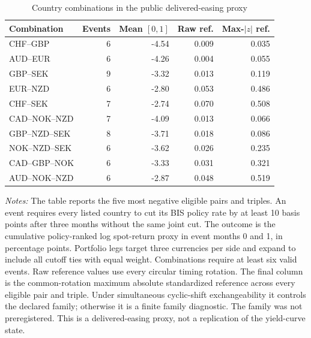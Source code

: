 \begin{table}[H]
\centering
\caption{Country combinations in the public delivered-easing proxy}
\label{tab:public-country-combinations}
\small
\begin{tabular}{lrrrr}
\toprule
Combination & Events & Mean $[0,1]$ & Raw ref. & Max-$|z|$ ref. \\
\midrule
CHF--GBP & 6 & -4.54 & 0.009 & 0.035 \\
AUD--EUR & 6 & -4.26 & 0.004 & 0.055 \\
GBP--SEK & 9 & -3.32 & 0.013 & 0.119 \\
EUR--NZD & 6 & -2.80 & 0.053 & 0.486 \\
CHF--SEK & 7 & -2.74 & 0.070 & 0.508 \\
CAD--NOK--NZD & 7 & -4.09 & 0.013 & 0.066 \\
GBP--NZD--SEK & 8 & -3.71 & 0.018 & 0.086 \\
NOK--NZD--SEK & 6 & -3.62 & 0.026 & 0.235 \\
CAD--GBP--NOK & 6 & -3.33 & 0.031 & 0.321 \\
AUD--NOK--NZD & 6 & -2.87 & 0.048 & 0.519 \\
\bottomrule
\end{tabular}
\begin{minipage}{0.94\textwidth}\footnotesize
\textit{Notes:} The table reports the five most negative eligible pairs and triples. An event requires every listed country to cut its BIS policy rate by at least 10 basis points after three months without the same joint cut. The outcome is the cumulative policy-ranked log spot-return proxy in event months 0 and 1, in percentage points. Portfolio legs target three currencies per side and expand to include all cutoff ties with equal weight. Combinations require at least six valid events. Raw reference values use every circular timing rotation. The final column is the common-rotation maximum absolute standardized reference across every eligible pair and triple. Under simultaneous cyclic-shift exchangeability it controls the declared family; otherwise it is a finite family diagnostic. The family was not preregistered. This is a delivered-easing proxy, not a replication of the yield-curve state.
\end{minipage}
\end{table}
